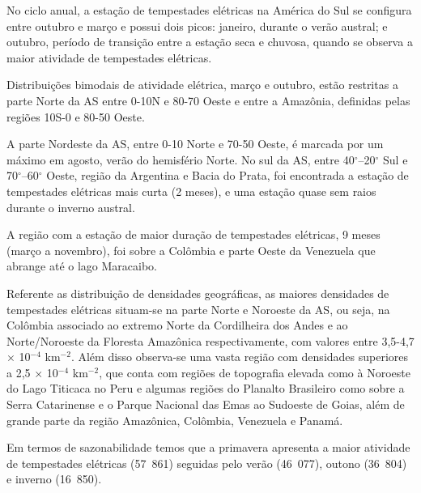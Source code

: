 
No ciclo anual, a estação de tempestades elétricas na América do Sul se configura entre outubro e março e possui dois picos: janeiro, durante o verão austral; e outubro, período de transição entre a estação seca e chuvosa, quando se observa a maior atividade de tempestades elétricas. 

Distribuições bimodais de atividade elétrica, março e outubro, estão restritas a parte Norte da AS entre 0-10N e 80-70 Oeste e entre a Amazônia, definidas pelas regiões 10S-0 e 80-50 Oeste. 

A parte Nordeste da AS, entre 0-10 Norte e 70-50 Oeste, é marcada por um máximo em agosto, verão do hemisfério Norte. No sul da AS,  entre 40$^{\circ}$--20$^{\circ}$ Sul e 70$^{\circ}$--60$^{\circ}$ Oeste, região da Argentina e Bacia do Prata, foi encontrada a estação de tempestades elétricas mais curta (2 meses), e uma estação quase sem raios durante o inverno austral.

A região com a estação de maior duração de tempestades elétricas,  9 meses (março a novembro), foi sobre a Colômbia e parte Oeste da Venezuela que abrange até o lago Maracaibo.  



Referente as distribuição de densidades geográficas, as maiores densidades de tempestades elétricas situam-se na parte Norte e Noroeste da AS, ou seja, na Colômbia associado ao extremo Norte da Cordilheira dos Andes e ao Norte/Noroeste da Floresta Amazônica respectivamente, com valores entre 3,5-4,7 $\times$ 10$^{-4}$ km$^{-2}$. Além disso observa-se uma vasta região com densidades superiores a  2,5 $\times$ 10$^{-4}$ km$^{-2}$, que conta com regiões de topografia elevada como à Noroeste do Lago Titicaca no Peru e algumas regiões do Planalto Brasileiro como sobre a Serra Catarinense e o Parque Nacional das Emas ao Sudoeste de Goias, além de grande parte da região Amazônica, Colômbia, Venezuela e Panamá.  

Em termos de sazonabilidade temos que a primavera apresenta a maior atividade de tempestades elétricas (57~861) seguidas pelo verão (46~077), outono (36~804) e inverno (16~850). 

